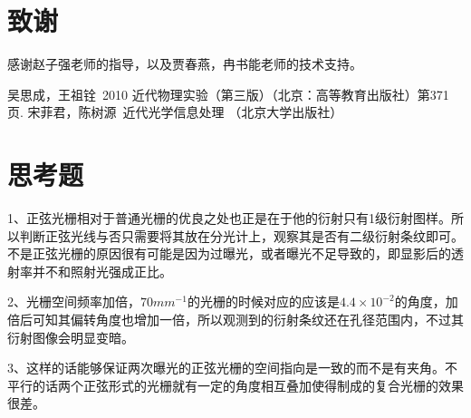 \documentclass[aps,pre,12pt,preprint,onecolumn,showpacs,showkeys,UTF8]{revtex4-1}
\begin{document}
 
\section{致谢}
感谢赵子强老师的指导，以及贾春燕，冉书能老师的技术支持。



\begin{thebibliography}{}
	 吴思成，王祖铨~2010 近代物理实验（第三版）（北京：高等教育出版社）第371页.
	 宋菲君，陈树源~近代光学信息处理 （北京大学出版社） 
%
%
\end{thebibliography}

\clearpage
\appendix
\section{思考题}

	1、正弦光栅相对于普通光栅的优良之处也正是在于他的衍射只有1级衍射图样。所以判断正弦光线与否只需要将其放在分光计上，观察其是否有二级衍射条纹即可。不是正弦光栅的原因很有可能是因为过曝光，或者曝光不足导致的，即显影后的透射率并不和照射光强成正比。

	2、光栅空间频率加倍，$70mm^{-1}$的光栅的时候对应的应该是$4.4\times10^{-2}$的角度，加倍后可知其偏转角度也增加一倍，所以观测到的衍射条纹还在孔径范围内，不过其衍射图像会明显变暗。

	3、这样的话能够保证两次曝光的正弦光栅的空间指向是一致的而不是有夹角。不平行的话两个正弦形式的光栅就有一定的角度相互叠加使得制成的复合光栅的效果很差。
\end{document}
